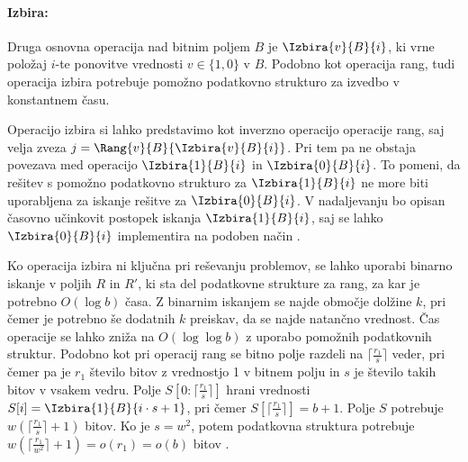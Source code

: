 \paragraph{Izbira:}
Druga osnovna operacija nad bitnim poljem $B$ je $\Izbira{v}{B}{i}$, ki vrne položaj $i$-te ponovitve vrednosti $v\in\{1,0\}$ v $B$. Podobno kot operacija rang, tudi operacija izbira potrebuje pomožno podatkovno strukturo za izvedbo v konstantnem času. 

Operacijo izbira si lahko predstavimo kot inverzno operacijo operacije rang, saj velja zveza $j=\Rang{v}{B}{\Izbira{v}{B}{i}}$. Pri tem pa ne obstaja povezava med operacijo $\Izbira{1}{B}{i}$ in $\Izbira{0}{B}{i}$. To pomeni, da rešitev s pomožno podatkovno strukturo za $\Izbira{1}{B}{i}$ ne more biti uporabljena za iskanje rešitve za $\Izbira{0}{B}{i}$. V nadaljevanju bo opisan časovno učinkovit postopek iskanja $\Izbira{1}{B}{i}$, saj se lahko $\Izbira{0}{B}{i}$ implementira na podoben način \cite{Navarro2016}.

Ko operacija izbira ni ključna pri reševanju problemov, se lahko uporabi binarno iskanje v poljih $R$ in $R'$, ki sta del podatkovne strukture za rang, za kar je potrebno $O(\log{b})$ časa. Z binarnim iskanjem se najde območje dolžine $k$, pri čemer je potrebno še dodatnih $k$ preiskav, da se najde natančno vrednost.
Čas operacije se lahko zniža na $O(\log\log b)$ z uporabo pomožnih podatkovnih struktur. Podobno kot pri operacij rang se bitno polje razdeli na $\lceil \frac{r_1}{s} \rceil$ veder, pri čemer pa je $r_1$ število bitov z vrednostjo 1 v bitnem polju in $s$ je število takih bitov v vsakem vedru. Polje $S[0:\lceil \frac{r_1}{s} \rceil]$ hrani vrednosti $S[i]=\Izbira{1}{B}{i\cdot s+1}$, pri čemer $S[\lceil \frac{r_1}{s} \rceil]=b+1$. Polje $S$ potrebuje $w(\lceil \frac{r_1}{s} \rceil +1)$ bitov. Ko je $s=w^2$, potem podatkovna struktura potrebuje $w(\lceil\frac{r_1}{w^2}\rceil+1)=o(r_1)=o(b)$ bitov \cite{Navarro2016}.

